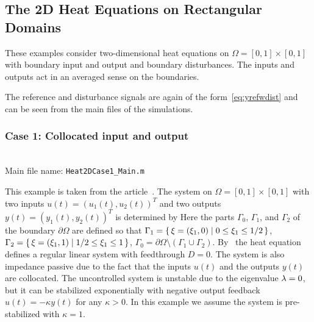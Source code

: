 \documentclass[11pt, a4paper]{amsart}
\theoremstyle{definition}
\numberwithin{equation}{section}
\begin{document}
\subsection{The 2D Heat Equations on Rectangular Domains}

These examples consider two-dimensional heat equations on $\Omega = [0,1]\times [0,1]$ with boundary input and output and boundary disturbances. The inputs and outputs act in an averaged sense on the boundaries.

The reference and disturbance signals are again of the form~\eqref{eq:yrefwdist} and can be seen from the main files of the simulations.

\medskip

\subsubsection*{Case 1: Collocated input and output}
~\\[-1ex]


  \noindent Main file name: \texttt{Heat2DCase1\_Main.m}

\medskip

This example is taken from the article~.
The system on $\Omega = [0,1]\times [0,1]$ with two inputs $u(t)=(u_1(t),u_2(t))^T$ and two outputs $y(t)=(y_1(t),y_2(t))^T$ is determined by
  Here the parts $\Gamma_0$, $\Gamma_1$, and $\Gamma_2$ of the boundary $\partial \Omega$ are defined so that
  $\Gamma_1 = \{\,\xi=(\xi_1,0)\mid0\leq \xi_1\leq 1/2\,\}$,
  $\Gamma_2 = \{\,\xi=(\xi_1,1)\mid1/2\leq \xi_1\leq 1\,\}$, 
  $\Gamma_0 = \partial \Omega \setminus (\Gamma_1 \cup \Gamma_2)$. By~\cite[Cor. 2]{ByrGil02} the heat equation defines a regular linear system with feedthrough $D=0$. The system is also impedance passive due to the fact that the inputs $u(t)$ and the outputs $y(t) $ are collocated.
The uncontrolled system is unstable due to the eigenvalue $\lambda=0$, but it can be stabilized exponentially with negative output feedback $u(t) = -\kappa y(t)$ for any $\kappa>0$.
In this example we assume the system is pre-stabilized with $\kappa = 1$.
\end{document}
